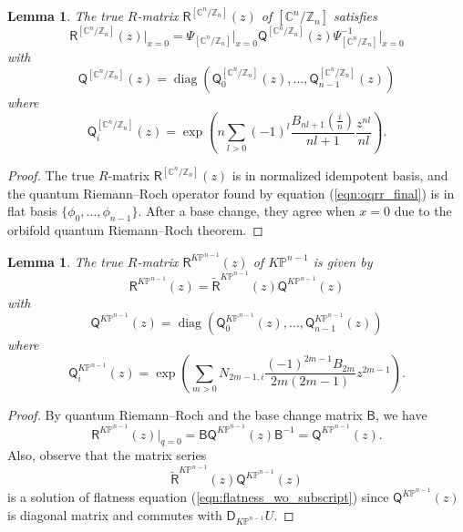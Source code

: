 \documentclass[12pt]{amsart}
\newtheorem{lem}[prop]{Lemma}
\numberwithin{equation}{section}
\newcommand{\CnZn}{[\mathbb{C}^n/\mathbb{Z}_n]}
\newcommand{\KP}{K\mathbb{P}}
\DeclareMathOperator{\diag}{diag}
\begin{document}
\begin{lem}\label{lem:True_R_Matrix_CnZn}
The true $R$-matrix ${\mathsf{R}}^{\CnZn}(z)$ of $\CnZn$ satisfies
\begin{equation*}
{\mathsf{R}}^{\CnZn}(z)\big\vert_{x=0}=\Psi_{\CnZn}\big\vert_{x=0}\mathsf{Q}^{\CnZn}(z)\Psi^{-1}_{\CnZn}\big\vert_{x=0}
\end{equation*}
with 
\begin{equation*}
\mathsf{Q}^{\CnZn}(z)=\diag(\mathsf{Q}_0^{\CnZn}(z),\ldots,\mathsf{Q}_{n-1}^{\CnZn}(z)) 
\end{equation*}
where
\begin{equation*}
\mathsf{Q}_i^{\CnZn}(z)=\exp\left(n\sum_{l>0}(-1)^{l}\frac{B_{nl+1}\left(\frac{i}{n}\right)}{nl+1}\frac{z^{nl}}{nl} \right).
\end{equation*}
\end{lem}

\begin{proof}
The true $R$-matrix ${\mathsf{R}}^{\CnZn}(z)$ is in normalized idempotent basis, and the quantum Riemann--Roch operator found by equation (\ref{eqn:oqrr_final}) is in flat basis $\{\phi_0,\ldots,\phi_{n-1}\}$. After a base change, they agree when $x=0$ due to the orbifold quantum Riemann--Roch theorem.
\end{proof}

\begin{lem}\label{lem:True_R_Matrix_KP}
The true $R$-matrix ${\mathsf{R}}^{\KP^{n-1}}(z)$ of $\KP^{n-1}$ is given by
\begin{equation*}
{\mathsf{R}}^{\KP^{n-1}}(z)=\widetilde{\mathsf{R}}^{\KP^{n-1}}(z)\mathsf{Q}^{\KP^{n-1}}(z)
\end{equation*}
with 
\begin{equation*}
\mathsf{Q}^{\KP^{n-1}}(z)=\diag(\mathsf{Q}_0^{\KP^{n-1}}(z),\ldots,\mathsf{Q}_{n-1}^{\KP^{n-1}}(z)) 
\end{equation*}
where
\begin{equation*}
\mathsf{Q}_i^{\KP^{n-1}}(z)=\exp\left(\sum_{m>0}N_{2m-1, i}\frac{(-1)^{2m-1}B_{2m}}{2m(2m-1)}z^{2m-1}\right).    
\end{equation*}
\end{lem}

\begin{proof}
By quantum Riemann--Roch and the base change matrix $\mathsf{B}$, we have
\begin{equation*}
{\mathsf{R}}^{\KP^{n-1}}(z)\big\vert_{q=0}=\mathsf{B}\mathsf{Q}^{\KP^{n-1}}(z)\mathsf{B}^{-1}=\mathsf{Q}^{\KP^{n-1}}(z).
\end{equation*}
Also, observe that the matrix series
\begin{equation*}
  \widetilde{\mathsf{R}}^{\KP^{n-1}}(z)\mathsf{Q}^{\KP^{n-1}}(z)  
\end{equation*}
is a solution of flatness equation (\ref{eqn:flatness_wo_subscript}) since $\mathsf{Q}^{\KP^{n-1}}(z) $ is diagonal matrix and commutes with $\mathsf{D}_{\KP^{n-1}}U$.
\end{proof}
\end{document}
